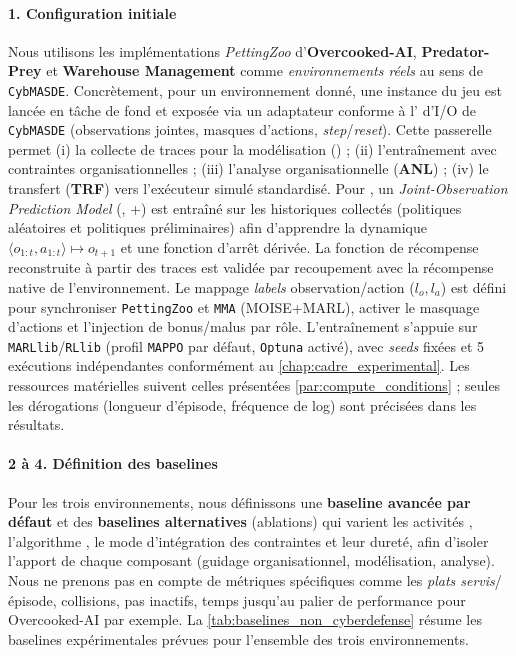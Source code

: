 \paragraph{1. Configuration initiale}

Nous utilisons les implémentations \emph{PettingZoo} d'\textbf{Overcooked-AI}, \textbf{Predator-Prey} et \textbf{Warehouse Management} comme \emph{environnements réels} au sens de \texttt{CybMASDE}. Concrètement, pour un environnement donné, une instance du jeu est lancée en tâche de fond et exposée via un adaptateur  conforme à l' d'I/O de \texttt{CybMASDE} (observations jointes, masques d'actions, \emph{step}/\emph{reset}). Cette passerelle permet (i) la collecte de traces pour la modélisation (\texttt{}) ; (ii) l'entraînement  avec contraintes organisationnelles ; (iii) l'analyse organisationnelle (\textbf{ANL}) ; (iv) le transfert (\textbf{TRF}) vers l'exécuteur simulé standardisé.
Pour \texttt{}, un \emph{Joint-Observation Prediction Model} (, +) est entraîné sur les historiques collectés (politiques aléatoires et politiques préliminaires) afin d'apprendre la dynamique $\langle o_{1:t},a_{1:t} \rangle \mapsto o_{t+1}$ et une fonction d'arrêt dérivée. La fonction de récompense reconstruite à partir des traces est validée par recoupement avec la récompense native de l'environnement. Le mappage \emph{labels} observation/action ($l_o, l_a$) est défini pour synchroniser \texttt{PettingZoo} et \texttt{MMA} (MOISE+MARL), activer le masquage d'actions et l'injection de bonus/malus par rôle. L'entraînement s'appuie sur \texttt{MARLlib}/\texttt{RLlib} (profil \texttt{MAPPO} par défaut, \texttt{Optuna} activé), avec \textit{seeds} fixées et 5 exécutions indépendantes conformément au \autoref{chap:cadre_experimental}. Les ressources matérielles suivent celles présentées \autoref{par:compute_conditions} ; seules les dérogations (longueur d'épisode, fréquence de log) sont précisées dans les résultats.

\paragraph{2 à 4. Définition des baselines}

Pour les trois environnements, nous définissons une \textbf{baseline avancée par défaut} et des \textbf{baselines alternatives} (ablations) qui varient les activités , l'algorithme , le mode d'intégration des contraintes et leur dureté, afin d'isoler l'apport de chaque composant (guidage organisationnel, modélisation, analyse). Nous ne prenons pas en compte de métriques spécifiques comme les \emph{plats servis}/épisode, collisions, pas inactifs, temps jusqu'au palier de performance pour Overcooked-AI par exemple. La \autoref{tab:baselines_non_cyberdefense} résume les baselines expérimentales prévues pour l'ensemble des trois environnements.


